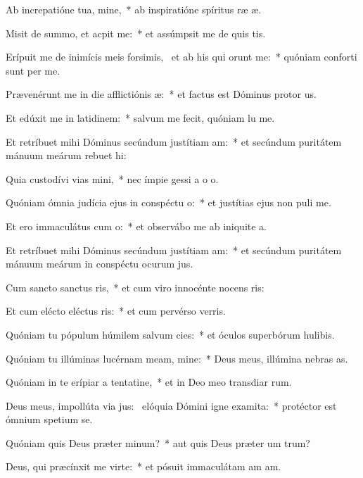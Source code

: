 \item Ab increpatióne tua, mine,~* ab inspiratióne spíritus ræ æ.
\item Misit de summo, et acpit me:~* et assúmpsit me de quis tis.
\item Erípuit me de inimícis meis forsimis,~\pscross{} et ab his qui orunt me:~* quóniam conforti sunt per me.
\item Prævenérunt me in die afflictiónis æ:~* et factus est Dóminus protor us.
\item Et edúxit me in latidinem:~* salvum me fecit, quóniam lu me.
\item Et retríbuet mihi Dóminus secúndum justítiam am:~* et secúndum puritátem mánuum meárum rebuet hi:
\item Quia custodívi vias mini,~* nec ímpie gessi a o o.
\item Quóniam ómnia judícia ejus in conspéctu o:~* et justítias ejus non puli  me.
\item Et ero immaculátus cum o:~* et observábo me ab iniquite a.
\item Et retríbuet mihi Dóminus secúndum justítiam am:~* et secúndum puritátem mánuum meárum in conspéctu ocurum jus.
\item Cum sancto sanctus ris,~* et cum viro innocénte nocens ris:
\item Et cum elécto eléctus ris:~* et cum pervérso verris.
\item Quóniam tu pópulum húmilem salvum cies:~* et óculos superbórum hulibis.
\item Quóniam tu illúminas lucérnam meam, mine:~* Deus meus, illúmina nebras as.
\item Quóniam in te erípiar a tentatine,~* et in Deo meo transdiar rum.
\item Deus meus, impollúta via jus:~\pscross{} elóquia Dómini igne examita:~* protéctor est ómnium spetium  se.
\item Quóniam quis Deus præter minum?~* aut quis Deus præter um trum?
\item Deus, qui præcínxit me virte:~* et pósuit immaculátam am am.
